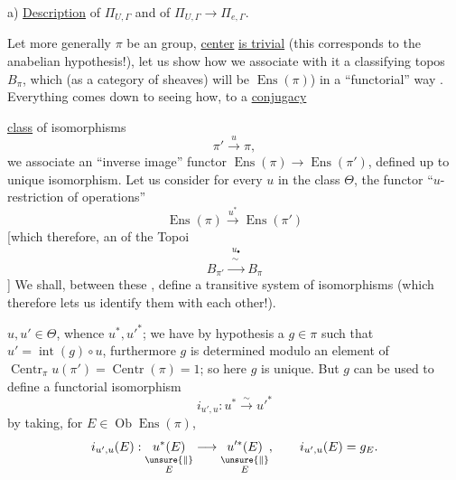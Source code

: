 a) \uline{Description} of \(\Pi_{U,\Gamma}\) and of \(\Pi_{U,\Gamma}\longrightarrow\Pi_{e,\Gamma}\).

Let more generally \(\pi\) be an  group,  
\uline{center} \uline{is trivial} (this corresponds to the
anabelian hypothesis!), let us show how we
associate with it a classifying topos
\(B_\pi\), which (as a category of sheaves) will be
\(\operatorname{Ens}(\pi)\)) in a ``functorial'' way . Everything
comes down to seeing how, to a \uline{conjugacy}

\uline{class} \inserted{\(\Theta\)} of isomorphisms
\[
\pi'\xrightarrow{u}\pi,
\]
we associate an ``inverse image'' functor
\(\operatorname{Ens}(\pi)\longrightarrow\operatorname{Ens}(\pi')\), defined up to unique
isomorphism. Let us consider for every \(u\) in the class
\(\Theta\), the functor ``\(u\)-restriction of operations''
\[
\operatorname{Ens}(\pi)\xrightarrow{u^*}\operatorname{Ens}(\pi')
\]
[which  therefore, 
an  of the Topoi
\[
B_{\pi'}\xrightarrow{\substack{u_\bullet\\ \sim}} B_\pi
\]
]
We shall, between these ,  define a
transitive system of isomorphisms (which therefore lets us
identify them with each other!).

 \(u,u'\in\Theta\), whence \(u^*,u'^*\); we have by hypothesis
 a \(g\in\pi\) such that \(u'=\operatorname{int}(g)\circ u\),
furthermore \(g\) is determined modulo an
element of \(\operatorname{Centr}_\pi u(\pi')=\operatorname{Centr}(\pi)=1\);
so here \(g\) is unique. But \(g\)
can be used to define a functorial
isomorphism 
\[
i_{u',u}:u^*\xrightarrow{\sim}u'^*
\]
by taking, for \(E\in\operatorname{Ob}\operatorname{Ens}(\pi)\),
\[
i_{u',u}(E):
\underset{\substack{\unsure{\Vert}\\E}}{u^*(E)}
\longrightarrow
\underset{\substack{\unsure{\Vert}\\E}}{u'^*(E)},
\qquad i_{u',u}(E)=g_E.
\]

